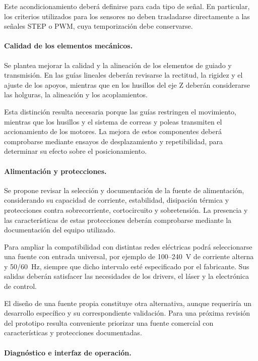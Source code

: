\documentclass[blue,fullpaper]{ludusofficial}  %
\begin{document}
Este acondicionamiento deberá definirse para
cada tipo de señal. En particular, los criterios
utilizados para los sensores no deben trasladarse
directamente a las señales STEP o PWM, cuya
temporización debe conservarse.

\paragraph{Calidad de los elementos mecánicos.}

Se plantea mejorar la calidad y la alineación
de los elementos de guiado y transmisión.
En las guías lineales deberán revisarse
la rectitud, la rigidez y el ajuste de los
apoyos, mientras que en los husillos del
eje Z deberán considerarse las holguras,
la alineación y los acoplamientos.

Esta distinción resulta necesaria porque
las guías restringen el movimiento, mientras
que los husillos y el sistema de correas
y poleas transmiten el accionamiento de
los motores. La mejora de estos componentes
deberá comprobarse mediante ensayos de
desplazamiento y repetibilidad, para determinar
su efecto sobre el posicionamiento.

\paragraph{Alimentación y protecciones.}

Se propone revisar la selección y documentación
de la fuente de alimentación, considerando
su capacidad de corriente, estabilidad,
disipación térmica y protecciones contra
sobrecorriente, cortocircuito y sobretensión.
La presencia y las características de estas
protecciones deberán comprobarse mediante
la documentación del equipo utilizado.

Para ampliar la compatibilidad con distintas
redes eléctricas podrá seleccionarse una
fuente con entrada universal, por ejemplo
de 100--240~V de corriente alterna y
50/60~Hz, siempre que dicho intervalo
esté especificado por el fabricante.
Sus salidas deberán satisfacer las
necesidades de los drivers, el láser
y la electrónica de control.

El diseño de una fuente propia constituye
otra alternativa, aunque requeriría un
desarrollo específico y su correspondiente
validación. Para una próxima revisión del
prototipo resulta conveniente priorizar
una fuente comercial con características
y protecciones documentadas.

\paragraph{Diagnóstico e interfaz de operación.}
\end{document}
